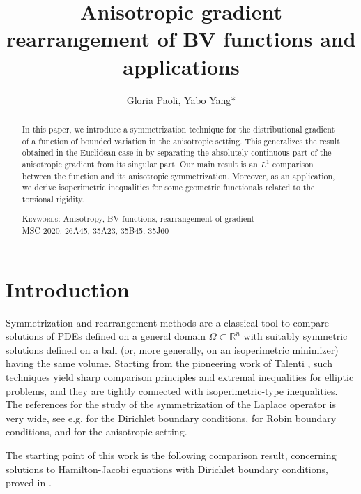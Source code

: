 \documentclass[oneside,a4paper,12pt,notitlepage]{article}
\title{Anisotropic gradient rearrangement of BV functions and applications}
\author{Gloria Paoli, Yabo Yang*}
\date{}
\makeatletter
\theoremstyle{definition}
\newcommand{\R}{\mathbb{R}}
\newcommand{\Addresses}{{
\bigskip 
  \footnotesize 
  \textit{E-mail address}, Y.~Yang (corresponding author): \texttt{Yabo\_Yang0927@outlook.com} 
  
   \medskip 

\textsc{School of Mathematics and Statistics, Beijing Institute of Technology, Beijing 100081, P. R. China}
   
     \textit{E-mail address}, G.~Paoli: \texttt{gloria.paoli@unina.it} 
   \medskip 
   
 \textsc{Dipartimento di Matematica e Applicazioni ``R. Caccioppoli'', Universit\`a degli studi di Napoli Federico II, Via Cintia, Complesso Universitario Monte S. Angelo, 80126 Napoli, Italy.}
 
 
 \par\nopagebreak 

}}
\makeatother
\begin{document}
\maketitle
 \begin{abstract}
In this paper, we introduce a symmetrization technique for the distributional gradient of a function of bounded variation  in the anisotropic setting. This generalizes the result obtained in the Euclidean case in \cite{AGNT24} by separating the absolutely continuous part of the anisotropic gradient from its singular part. Our main result is  an $L^1$ comparison between the function and its anisotropic symmetrization. Moreover, as an application,  we 
 derive isoperimetric inequalities for some geometric functionals related to the torsional rigidity.



\textsc{Keywords:} Anisotropy, BV functions, rearrangement of gradient \\
\textsc{MSC 2020:}  26A45, 35A23, 35B45; 35J60
\end{abstract}





\section{Introduction}

Symmetrization and rearrangement methods are a classical tool to compare solutions of PDEs defined on a general domain $\Omega\subset\R^n$
with suitably symmetric solutions defined on a ball (or, more generally, on an isoperimetric minimizer) having the same volume.
Starting from the pioneering work of Talenti \cite{Talenti76}, such techniques yield sharp comparison principles and extremal inequalities
for elliptic problems, and they are tightly connected with isoperimetric-type inequalities. The references for the study of the symmetrization of the Laplace operator is very wide, see e.g. \cite{AFLT97,lions1981solutions,lions1982generalized,T2,T4,T3} for the Dirichlet boundary conditions,  \cite{ANT, BG, MP23, MP24} for Robin boundary conditions, and \cite{CY24, CY25,Sannipoli22} for the anisotropic setting. 

The starting point of this work is the following comparison result, concerning solutions to Hamilton-Jacobi equations with Dirichlet boundary conditions, proved in \cite{giarrusso-Nunziante1984}.
\end{document}
